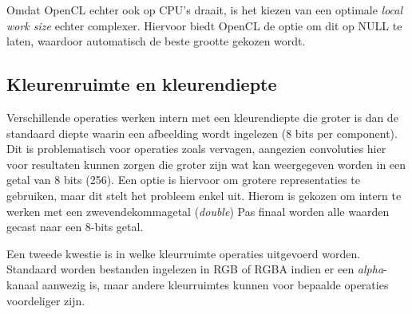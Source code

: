 \documentclass[twocolumn, a4paper]{article}
\begin{document}
Omdat OpenCL echter ook op CPU's draait, is het kiezen van een optimale \emph{local work size} echter complexer. Hiervoor biedt OpenCL de optie om dit op NULL te laten, waardoor automatisch de beste grootte gekozen wordt.

\subsection{Kleurenruimte en kleurendiepte}
Verschillende operaties werken intern met een kleurendiepte die groter is dan de standaard diepte waarin een afbeelding wordt ingelezen (8 bits per component). Dit is problematisch voor operaties zoals vervagen, aangezien convoluties hier voor resultaten kunnen zorgen die groter zijn wat kan weergegeven worden in een getal van 8 bits (256). Een optie is hiervoor om grotere representaties te gebruiken, maar dit stelt het probleem enkel uit. Hierom is gekozen om intern te werken met een zwevendekommagetal (\emph{double}) Pas finaal worden alle waarden gecast naar een 8-bits getal.

Een tweede kwestie is in welke kleurruimte operaties uitgevoerd worden. Standaard worden bestanden ingelezen in RGB of RGBA indien er een \emph{alpha}-kanaal aanwezig is, maar andere kleurruimtes kunnen voor bepaalde operaties voordeliger zijn.
\end{document}
